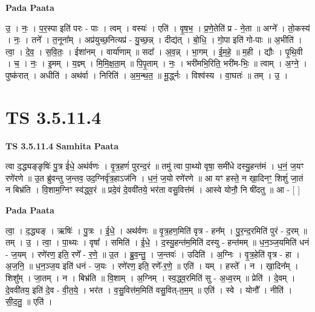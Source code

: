 \documentclass[17pt]{extarticle}
\begin{document}
\textbf{Pada Paata} \newline

उ॒ । नः॒ । प॒र॒स्पा इति॑ परः - पाः । त्वम् । वस्यः॑ । एति॑ । वृ॒ष॒भ॒ । प्र॒णे॒तेति॑ प्र - ने॒ता ॥ अग्ने᳚ । तो॒कस्य॑ । नः॒ । तने᳚ । त॒नूना᳚म् । अप्र॑युच्छ॒नित्यप्र॑ - यु॒च्छ॒न्न् । दीद्य॑त् । बो॒धि॒ । गो॒पा इति॑ गो-पाः ॥ अ॒भीति॑ । त्वा॒ । दे॒व॒ । स॒वि॒तः॒ । ईशा॑नम् । वार्या॑णाम् ॥ सदा᳚ । अ॒व॒न्न् । भा॒गम् । ई॒म॒हे॒ ॥ म॒ही । द्यौः । पृ॒थि॒वी । च॒ । नः॒ । इ॒मम् । य॒ज्ञ्म् । मि॒मि॒क्ष॒ता॒म् ॥ पि॒पृ॒ताम् । नः॒ । भरी॑मभि॒रिति॒ भरी॑म-भिः॒ ॥ त्वाम् । अ॒ग्ने॒ । पुष्क॑रात् । अधीति॑ । अथ॑र्वा । निरिति॑ । अ॒म॒न्थ॒त॒ ॥ मू॒र्द्ध्नः । विश्व॑स्य । वा॒घतः॑ ॥ तम् । उ॒ ।  \newline




\section*{ TS 3.5.11.4 }

\textbf{TS 3.5.11.4 } \newline
\textbf{Samhita Paata} \newline

त्वा द॒द्ध्यङ्ङृषिः॑ पु॒त्र ई॑धे॒ अथ॑र्वणः । वृ॒त्र॒हणं॑ पुरन्द॒रं ॥ तमु॑ त्वा पा॒थ्यो वृषा॒ समी॑धे दस्यु॒हन्त॑मं । ध॒नं॒ ज॒यꣳ रणे॑रणे ॥ उ॒त ब्रु॑वन्तु ज॒न्तव॒ उद॒ग्निर्वृ॑त्र॒हाऽज॑नि । ध॒नं॒ ज॒यो रणे॑रणे ॥ आ यꣳ हस्ते॒ न खा॒दिनꣳ॒॒ शिशुं॑ जा॒तं न बिभ्र॑ति । वि॒शाम॒ग्निꣳ स्व॑द्ध्व॒रं ॥ प्रदे॒वं दे॒ववी॑तये॒ भर॑ता वसु॒वित्त॑मं । आस्वे योनौ॒ नि षी॑दतु ॥ आ - [  ] \newline

\textbf{Pada Paata} \newline

त्वा॒ । द॒द्ध्यङ् । ऋषिः॑ । पु॒त्रः । ई॒धे॒ । अथ॑र्वणः ॥ वृ॒त्र॒हण॒मिति॑ वृत्र - हन᳚म् । पु॒र॒न्द॒रमिति॑ पुरं - द॒रम् ॥ तम् । उ॒ । त्वा॒ । पा॒थ्यः । वृषा᳚ । समिति॑ । ई॒धे॒ । द॒स्यु॒हन्त॑म॒मिति॑ दस्यु - हन्त॑मम् ॥ ध॒न॒ञ्ज॒यमिति॑ धनं - ज॒यम् । रणे॑रण॒ इति॒ रणे᳚ - र॒णे॒ ॥ उ॒त । ब्रु॒व॒न्तु॒ । ज॒न्तवः॑ । उदिति॑ । अ॒ग्निः । वृ॒त्र॒हेति॑ वृत्र - हा । अ॒ज॒नि॒ ॥ ध॒न॒ञ्ज॒य इति॑ धनं - ज॒यः । रणे॑रण॒ इति॒ रणे᳚-र॒णे॒ ॥ एति॑ । यम् । हस्ते᳚ । न । खा॒दिन᳚म् । शिशु᳚म् । जा॒तम् । न । बिभ्र॑ति ॥ वि॒शाम् । अ॒ग्निम् । स्व॒द्ध्व॒रमिति॑ सु - अ॒ध्व॒रम् ॥ प्रेति॑ । दे॒वम् । दे॒ववी॑तय॒ इति॑ दे॒व - वी॒त॒ये॒ । भर॑त । व॒सु॒वित्त॑म॒मिति॑ वसु॒वित्-त॒म॒म् ॥ एति॑ । स्वे । योनौ᳚ । नीति॑ । सी॒द॒तु॒ ॥ एति॑ ।  \newline
\end{document}
